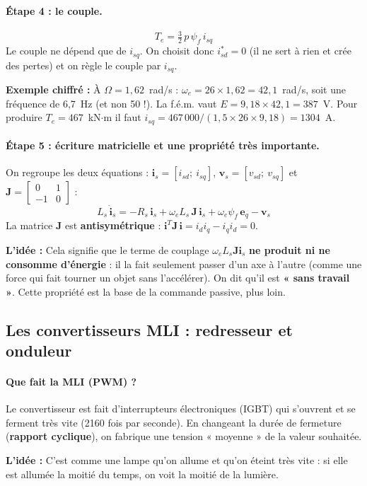 \documentclass[11pt,a4paper]{article}
\newcommand{\bv}[1]{\boldsymbol{#1}}
\newcommand{\Idee}{\textbf{L'idée : }}
\newcommand{\Exemple}{\textbf{Exemple chiffré : }}
\begin{document}
\paragraph{Étape 4 : le couple.}
\begin{equation}
T_e = \tfrac32\, p\, \psi_f\, i_{sq}
\end{equation}
Le couple ne dépend que de $i_{sq}$. On choisit donc $i_{sd}^*=0$ (il ne sert à rien et crée des pertes)
et on règle le couple par $i_{sq}$.

\begin{exemple}
\Exemple
À $\Omega=1{,}62$~rad/s : $\omega_e = 26\times 1{,}62 = 42{,}1$~rad/s, soit une fréquence de 6,7~Hz
(et non 50 !). La f.é.m. vaut $E = 9{,}18\times 42{,}1 = 387$~V.
Pour produire $T_e = 467$~kN$\cdot$m il faut $i_{sq} = 467\,000/(1{,}5\times 26\times 9{,}18) = 1304$~A.
\end{exemple}

\paragraph{Étape 5 : écriture matricielle et une propriété très importante.}
On regroupe les deux équations : $\bv{i}_s=[i_{sd};\ i_{sq}]$, $\bv{v}_s=[v_{sd};\ v_{sq}]$ et
$\mathbf{J}=\begin{bmatrix}0&1\\-1&0\end{bmatrix}$ :
\begin{equation}
L_s\,\dot{\bv{i}}_s = -R_s\,\bv{i}_s + \omega_e L_s\,\mathbf{J}\,\bv{i}_s + \omega_e\psi_f\,\bv{e}_q - \bv{v}_s
\end{equation}
La matrice $\mathbf{J}$ est \textbf{antisymétrique} : $\bv{i}^T\mathbf{J}\,\bv{i} = i_d i_q - i_q i_d = 0$.
\begin{idee}
\Idee
Cela signifie que le terme de couplage $\omega_e L_s\mathbf{J}\bv{i}_s$ \textbf{ne produit ni ne consomme
d'énergie} : il la fait seulement passer d'un axe à l'autre (comme une force qui fait tourner un objet
sans l'accélérer). On dit qu'il est \textbf{« sans travail »}.
Cette propriété est la base de la commande passive, plus loin.
\end{idee}

\subsection{Les convertisseurs MLI : redresseur et onduleur}
\paragraph{Que fait la MLI (PWM) ?}
Le convertisseur est fait d'interrupteurs électroniques (IGBT) qui s'ouvrent et se ferment très vite
(2160 fois par seconde). En changeant la durée de fermeture (\textbf{rapport cyclique}), on fabrique une
tension « moyenne » de la valeur souhaitée.
\begin{idee}
\Idee
C'est comme une lampe qu'on allume et qu'on éteint très vite : si elle est allumée la moitié du temps,
on voit la moitié de la lumière.
\end{idee}
\end{document}
